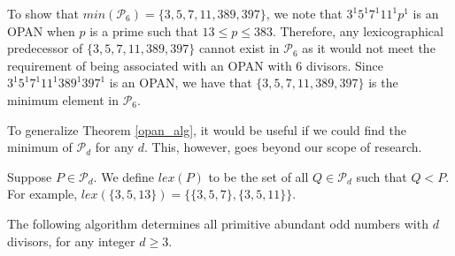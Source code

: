 \documentclass[../paper.tex]{subfiles}
\begin{document}
To show that $min(\mathcal{P}_6) = \{3, 5, 7, 11, 389, 397\}$, we
note that $3^1 5^1 7^1 11^1 p^1$ is an OPAN when $p$ is a prime
such that $13 \leq p \leq 383$. Therefore, any lexicographical
predecessor of $\{3, 5, 7, 11, 389, 397\}$ cannot exist in
$\mathcal{P}_6$ as it would not meet the requirement of being
associated with an OPAN with 6 divisors. Since $3^1 5^1 7^1 11^1 
389^1 397^1$ is an OPAN, we have that $\{3, 5, 7, 11, 389, 397\}$
is the minimum element in $\mathcal{P}_6$.

To generalize Theorem {\ref{opan_alg}}, it would be useful if we
could find the minimum of $\mathcal{P}_d$ for any $d$. This,
however, goes beyond our scope of research.

Suppose $P \in \mathcal{P}_d$. We define $lex(P)$ to be the set
of all $Q \in \mathcal{P}_d$ such that $Q < P$. For example,  
$lex(\{3,5,13\}) = \{\{3, 5, 7\}, \{3, 5, 11\}\}$.

\begin{theorem} \label{opan_alg}
The following algorithm determines all primitive
abundant odd numbers with $d$ divisors, for any integer $d \geq 3$.
\end{theorem}

\noindent{}
\end{document}
